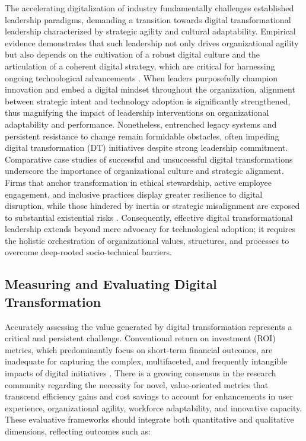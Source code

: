 \documentclass[sigconf]{acmart}
\begin{document}
The accelerating digitalization of industry fundamentally challenges established leadership paradigms, demanding a transition towards digital transformational leadership characterized by strategic agility and cultural adaptability. Empirical evidence demonstrates that such leadership not only drives organizational agility but also depends on the cultivation of a robust digital culture and the articulation of a coherent digital strategy, which are critical for harnessing ongoing technological advancements \cite{ref93}. When leaders purposefully champion innovation and embed a digital mindset throughout the organization, alignment between strategic intent and technology adoption is significantly strengthened, thus magnifying the impact of leadership interventions on organizational adaptability and performance. Nonetheless, entrenched legacy systems and persistent resistance to change remain formidable obstacles, often impeding digital transformation (DT) initiatives despite strong leadership commitment. Comparative case studies of successful and unsuccessful digital transformations underscore the importance of organizational culture and strategic alignment. Firms that anchor transformation in ethical stewardship, active employee engagement, and inclusive practices display greater resilience to digital disruption, while those hindered by inertia or strategic misalignment are exposed to substantial existential risks \cite{ref93}. Consequently, effective digital transformational leadership extends beyond mere advocacy for technological adoption; it requires the holistic orchestration of organizational values, structures, and processes to overcome deep-rooted socio-technical barriers.

\subsection{Measuring and Evaluating Digital Transformation}

Accurately assessing the value generated by digital transformation represents a critical and persistent challenge. Conventional return on investment (ROI) metrics, which predominantly focus on short-term financial outcomes, are inadequate for capturing the complex, multifaceted, and frequently intangible impacts of digital initiatives \cite{ref94}. There is a growing consensus in the research community regarding the necessity for novel, value-oriented metrics that transcend efficiency gains and cost savings to account for enhancements in user experience, organizational agility, workforce adaptability, and innovative capacity. These evaluative frameworks should integrate both quantitative and qualitative dimensions, reflecting outcomes such as:
\end{document}
